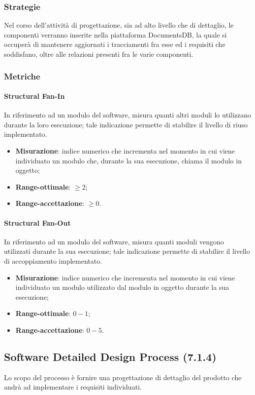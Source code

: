 \subsubsection{Strategie}
Nel corso dell'attività di progettazione, sia ad alto livello che di dettaglio, le componenti verranno inserite nella piattaforma DocumentsDB, la quale si occuperà di mantenere aggiornati i tracciamenti fra esse ed i requisiti che soddisfano, oltre alle relazioni presenti fra le varie componenti.
\subsubsection{Metriche}
\paragraph{Structural Fan-In}
In riferimento ad un modulo del software, misura quanti altri moduli lo utilizzano durante la loro esecuzione; tale indicazione permette di stabilire il livello di riuso implementato.
\begin{itemize}
\item \textbf{Misurazione}: indice numerico che incrementa nel momento in cui viene individuato un modulo che, durante la sua esecuzione, chiama il modulo in oggetto;
\item \textbf{Range-ottimale}: $\geq 2$;
\item \textbf{Range-accettazione}: $\geq 0$.
\end{itemize}
\paragraph{Structural Fan-Out}
In riferimento ad un modulo del software, misura quanti moduli vengono utilizzati durante la sua esecuzione; tale indicazione permette di stabilire il livello di accoppiamento implementato.
\begin{itemize}
\item \textbf{Misurazione}: indice numerico che incrementa nel momento in cui viene individuato un modulo utilizzato dal modulo in oggetto durante la sua esecuzione;
\item \textbf{Range-ottimale}: $0 - 1$;
\item \textbf{Range-accettazione}: $0 - 5$.
\end{itemize}

\subsection{Software Detailed Design Process (7.1.4)}
Lo scopo del processo è fornire una progettazione di dettaglio del prodotto che andrà ad implementare i requisiti individuati.
